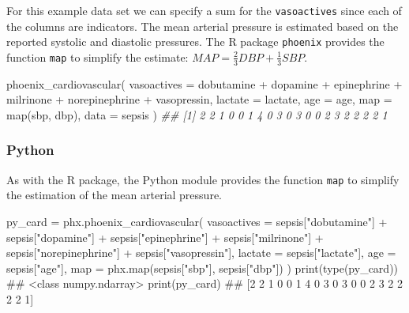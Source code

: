 \documentclass[
  letterpaper,
  DIV=11,
  numbers=noendperiod]{scrartcl}
\newenvironment{Shaded}{\begin{snugshade}}{\end{snugshade}}
\newcommand{\AttributeTok}[1]{\textcolor[rgb]{0.40,0.45,0.13}{#1}}
\newcommand{\BuiltInTok}[1]{\textcolor[rgb]{0.00,0.23,0.31}{#1}}
\newcommand{\CommentTok}[1]{\textcolor[rgb]{0.37,0.37,0.37}{#1}}
\newcommand{\DocumentationTok}[1]{\textcolor[rgb]{0.37,0.37,0.37}{\textit{#1}}}
\newcommand{\FunctionTok}[1]{\textcolor[rgb]{0.28,0.35,0.67}{#1}}
\newcommand{\NormalTok}[1]{\textcolor[rgb]{0.00,0.23,0.31}{#1}}
\newcommand{\OperatorTok}[1]{\textcolor[rgb]{0.37,0.37,0.37}{#1}}
\newcommand{\SpecialCharTok}[1]{\textcolor[rgb]{0.37,0.37,0.37}{#1}}
\newcommand{\StringTok}[1]{\textcolor[rgb]{0.13,0.47,0.30}{#1}}
\begin{document}
For this example data set we can specify a sum for the
\texttt{vasoactives} since each of the columns are indicators. The mean
arterial pressure is estimated based on the reported systolic and
diastolic pressures. The R package \texttt{phoenix} provides the
function \texttt{map} to simplify the estimate:
\(MAP = \frac{2}{3}DBP + \frac{1}{3}SBP\).

\begin{Shaded}
\begin{Highlighting}[]
\FunctionTok{phoenix\_cardiovascular}\NormalTok{(}
  \AttributeTok{vasoactives =}\NormalTok{ dobutamine }\SpecialCharTok{+}\NormalTok{ dopamine }\SpecialCharTok{+}\NormalTok{ epinephrine }\SpecialCharTok{+}
\NormalTok{                milrinone }\SpecialCharTok{+}\NormalTok{ norepinephrine }\SpecialCharTok{+}\NormalTok{ vasopressin,}
  \AttributeTok{lactate =}\NormalTok{ lactate,}
  \AttributeTok{age =}\NormalTok{ age,}
  \AttributeTok{map =} \FunctionTok{map}\NormalTok{(sbp, dbp),}
  \AttributeTok{data =}\NormalTok{ sepsis}
\NormalTok{)}
\DocumentationTok{\#\#  [1] 2 2 1 0 0 1 4 0 3 0 3 0 0 2 3 2 2 2 2 1}
\end{Highlighting}
\end{Shaded}

\subsubsection{Python}\label{python-3}

As with the R package, the Python module provides the function
\texttt{map} to simplify the estimation of the mean arterial pressure.

\begin{Shaded}
\begin{Highlighting}[]
\NormalTok{py\_card }\OperatorTok{=}\NormalTok{ phx.phoenix\_cardiovascular(}
\NormalTok{    vasoactives }\OperatorTok{=}\NormalTok{ sepsis[}\StringTok{"dobutamine"}\NormalTok{] }\OperatorTok{+}\NormalTok{ sepsis[}\StringTok{"dopamine"}\NormalTok{] }\OperatorTok{+}\NormalTok{ sepsis[}\StringTok{"epinephrine"}\NormalTok{] }\OperatorTok{+}
\NormalTok{                  sepsis[}\StringTok{"milrinone"}\NormalTok{] }\OperatorTok{+}\NormalTok{ sepsis[}\StringTok{"norepinephrine"}\NormalTok{] }\OperatorTok{+}\NormalTok{ sepsis[}\StringTok{"vasopressin"}\NormalTok{],}
\NormalTok{    lactate }\OperatorTok{=}\NormalTok{ sepsis[}\StringTok{"lactate"}\NormalTok{],}
\NormalTok{    age }\OperatorTok{=}\NormalTok{ sepsis[}\StringTok{"age"}\NormalTok{],}
    \BuiltInTok{map} \OperatorTok{=}\NormalTok{ phx.}\BuiltInTok{map}\NormalTok{(sepsis[}\StringTok{"sbp"}\NormalTok{], sepsis[}\StringTok{"dbp"}\NormalTok{])}
\NormalTok{)}
\BuiltInTok{print}\NormalTok{(}\BuiltInTok{type}\NormalTok{(py\_card))}
\CommentTok{\#\# \textless{}class \textquotesingle{}numpy.ndarray\textquotesingle{}\textgreater{}}
\BuiltInTok{print}\NormalTok{(py\_card)}
\CommentTok{\#\# [2 2 1 0 0 1 4 0 3 0 3 0 0 2 3 2 2 2 2 1]}
\end{Highlighting}
\end{Shaded}
\end{document}
